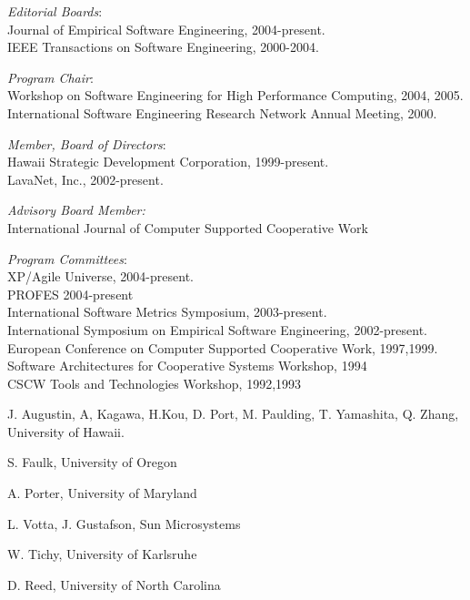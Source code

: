 \documentclass[11pt]{article}
\begin{document}
\begin{Synergistic Activities}
\item {\em Editorial Boards}:\\ 
Journal of Empirical Software Engineering, 2004-present.\\
IEEE Transactions on Software Engineering, 2000-2004.

\item {\em Program Chair}: \\
Workshop on Software Engineering for High Performance Computing, 2004, 2005.\\
International Software Engineering Research Network Annual Meeting, 2000.

\item {\em Member, Board of Directors}:\\
Hawaii Strategic Development Corporation, 1999-present.\\
LavaNet, Inc., 2002-present.

\item {\em Advisory Board Member:}\\ 
  International Journal of Computer Supported Cooperative Work

\item {\em Program Committees}: \\
  XP/Agile Universe, 2004-present.\\
  PROFES 2004-present\\
  International Software Metrics Symposium, 2003-present.\\
  International Symposium on Empirical Software Engineering, 2002-present.\\
  European Conference on Computer Supported Cooperative Work, 1997,1999.\\
  Software Architectures for Cooperative Systems Workshop, 1994 \\
  CSCW Tools and Technologies Workshop, 1992,1993 \\

\end{Synergistic Activities}



\begin{Collaborators}
\item J. Augustin, A, Kagawa, H.Kou, D. Port, M. Paulding, T. Yamashita, Q. Zhang, University of Hawaii.
\item S. Faulk, University of Oregon
\item A. Porter, University of Maryland
\item L. Votta, J. Gustafson, Sun Microsystems
\item W. Tichy, University of Karlsruhe
\item D. Reed, University of North Carolina
\end{Collaborators}
\end{document}
